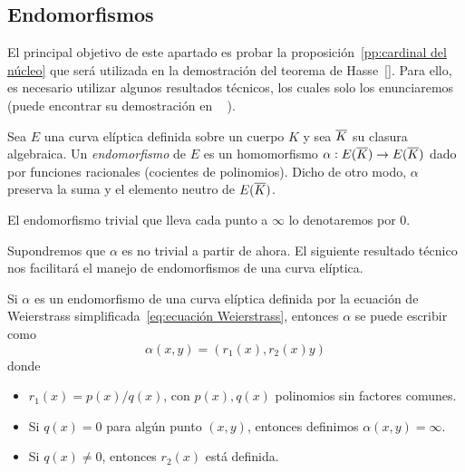 
\subsection{Endomorfismos}
\label{sub:Endomorfismos}

El principal objetivo de este apartado es probar la proposición~\ref{pp:cardinal del núcleo} que será utilizada en la demostración del teorema de Hasse~\ref{}. Para ello, es necesario utilizar algunos resultados técnicos, los cuales solo los enunciaremos (puede encontrar su demostración en ~\cite[sec. 2.9]{Washington:2008} ).


\begin{definicion}
	Sea $E$ una curva elíptica definida sobre un cuerpo $K$ y sea $\overline{K}$ su clasura algebraica. Un \emph{endomorfismo} de $E$ es un homomorfismo $\alpha: E(\overline{K}) \to E(\overline{K})$ dado por funciones racionales (cocientes de polinomios). Dicho de otro modo, $\alpha$ preserva la suma y el elemento neutro de $E(\overline{K})$.

	El endomorfismo trivial que lleva cada punto a $\infty$ lo denotaremos por 0.
\end{definicion}

Supondremos que $\alpha$ es no trivial a partir de ahora. El siguiente resultado técnico nos facilitará el manejo de endomorfismos de una curva elíptica.

\begin{lema}\label{lm:endomorfismo con funciones racionales}
	Si $\alpha$ es un endomorfismo de una curva elíptica definida por la ecuación de Weierstrass simplificada~\eqref{eq:ecuación Weierstrass}, entonces $\alpha$ se puede escribir como
	$$
	\alpha(x, y) = (r_1(x), r_2(x) y)
	$$
	donde
	\begin{itemize}
		\item $r_1(x) = p(x) / q(x)$, con $p(x), q(x)$ polinomios sin factores comunes.
		\item Si $q(x) = 0$ para algún punto $(x, y)$, entonces definimos $\alpha(x, y) = \infty$.
		\item Si $q(x) \neq 0$, entonces $r_2(x)$ está definida.
	\end{itemize}
\end{lema}

